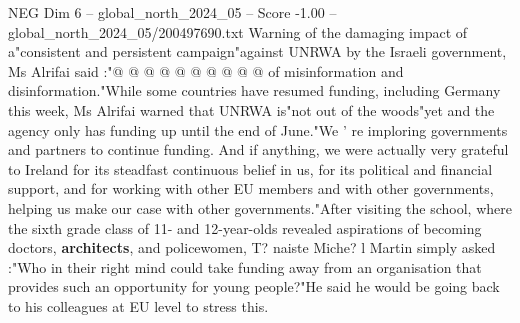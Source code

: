 \begin{textsample}{NEG Dim 6 – global\_north\_2024\_05 – Score -1.00 – global\_north\_2024\_05/200497690.txt}
Warning of the damaging impact of a"consistent and persistent campaign"against UNRWA by the Israeli government, Ms Alrifai said :"@ @ @ @ @ @ @ @ @ @ of misinformation and disinformation."While some countries have resumed funding, including Germany this week, Ms Alrifai warned that UNRWA is"not out of the woods"yet and the agency only has funding up until the end of June."We ' re imploring governments and partners to continue funding.
And if anything, we were actually very grateful to Ireland for its steadfast continuous belief in us, for its political and financial support, and for working with other EU members and with other governments, helping us make our case with other governments."After visiting the school, where the sixth grade class of 11- and 12-year-olds revealed aspirations of becoming doctors, \textbf{architects}, and policewomen, T? naiste Miche? l Martin simply asked :"Who in their right mind could take funding away from an organisation that provides such an opportunity for young people?"He said he would be going back to his colleagues at EU level to stress this.

\end{textsample}
